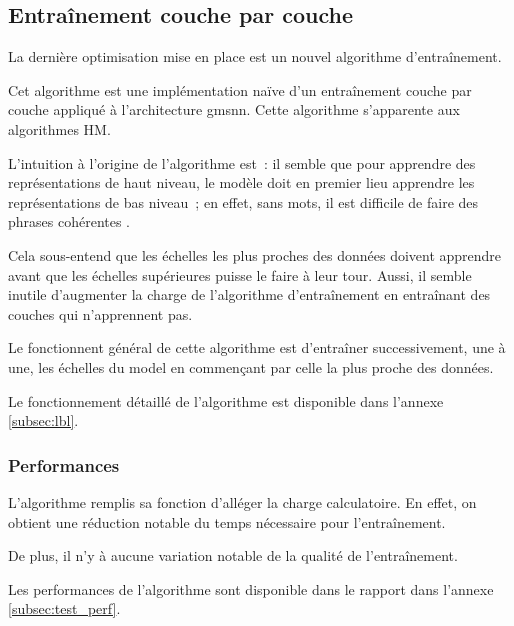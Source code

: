 \subsection{Entraînement couche par couche}\label{subsec:optilbl}
La dernière optimisation mise en place est un nouvel algorithme d'entraînement.

Cet algorithme est une implémentation naïve d'un entraînement couche par couche appliqué à l'architecture \gls{gmsnn}. Cette algorithme s'apparente aux algorithmes HM. %

L'intuition à l'origine de l'algorithme est~:
\og il semble que pour apprendre des représentations de haut niveau, le modèle doit en premier lieu apprendre les représentations de bas niveau~;
en effet, sans mots, il est difficile de faire des phrases cohérentes \fg{}.

Cela sous-entend que les échelles les plus proches des données doivent apprendre avant que les échelles supérieures puisse le faire à leur tour.
Aussi, il semble inutile d'augmenter la charge de l'algorithme d'entraînement en entraînant des couches qui n'apprennent pas.

Le fonctionnent général de cette algorithme est d'entraîner successivement, une à une, les échelles du \gls{model} en commençant par celle la plus proche des données.

Le fonctionnement détaillé de l'algorithme est disponible dans l'annexe \ref{subsec:lbl}.

\subsubsection{Performances}

L'algorithme remplis sa fonction d'alléger la charge calculatoire. En effet, on obtient une réduction notable du temps nécessaire pour l'entraînement.

De plus, il n'y à aucune variation notable de la qualité de l'entraînement.

Les performances de l'algorithme sont disponible dans le rapport dans l'annexe \ref{subsec:test_perf}.


